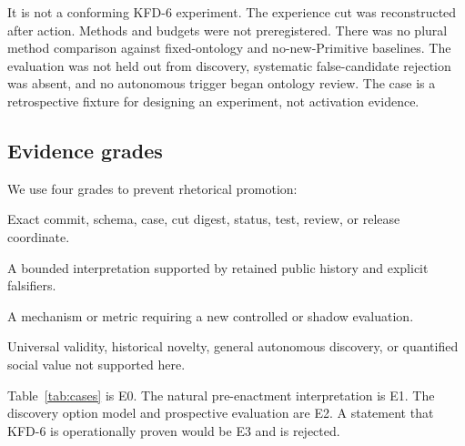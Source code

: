 It is not a conforming KFD-6 experiment. The experience cut was reconstructed
after action. Methods and budgets were not preregistered. There was no plural
method comparison against fixed-ontology and no-new-Primitive baselines. The
evaluation was not held out from discovery, systematic false-candidate
rejection was absent, and no autonomous trigger began ontology review. The
case is a retrospective fixture for designing an experiment, not activation
evidence.

\subsection{Evidence grades}

We use four grades to prevent rhetorical promotion:

\begin{description}[leftmargin=2.0em,style=nextline]
  \item[E0 -- repository fact.] Exact commit, schema, case, cut digest, status,
        test, review, or release coordinate.
  \item[E1 -- implementation-backed case inference.] A bounded interpretation
        supported by retained public history and explicit falsifiers.
  \item[E2 -- prospective hypothesis.] A mechanism or metric requiring a new
        controlled or shadow evaluation.
  \item[E3 -- non-claim.] Universal validity, historical novelty, general
        autonomous discovery, or quantified social value not supported here.
\end{description}

Table~\ref{tab:cases} is E0. The natural pre-enactment interpretation is E1.
The discovery option model and prospective evaluation are E2. A statement that
KFD-6 is operationally proven would be E3 and is rejected.
